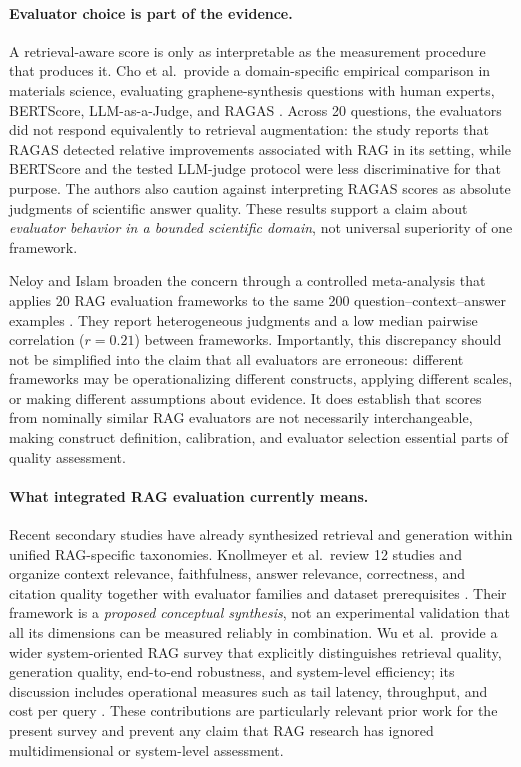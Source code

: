 \paragraph{Evaluator choice is part of the evidence.}
A retrieval-aware score is only as interpretable as the measurement procedure that produces it. Cho et al.\ provide a domain-specific empirical comparison in materials science, evaluating graphene-synthesis questions with human experts, BERTScore, LLM-as-a-Judge, and RAGAS \cite{cho2026graphene}. Across 20 questions, the evaluators did not respond equivalently to retrieval augmentation: the study reports that RAGAS detected relative improvements associated with RAG in its setting, while BERTScore and the tested LLM-judge protocol were less discriminative for that purpose. The authors also caution against interpreting RAGAS scores as absolute judgments of scientific answer quality. These results support a claim about \emph{evaluator behavior in a bounded scientific domain}, not universal superiority of one framework.

Neloy and Islam broaden the concern through a controlled meta-analysis that applies 20 RAG evaluation frameworks to the same 200 question--context--answer examples \cite{neloy2026metarag}. They report heterogeneous judgments and a low median pairwise correlation ($r=0.21$) between frameworks. Importantly, this discrepancy should not be simplified into the claim that all evaluators are erroneous: different frameworks may be operationalizing different constructs, applying different scales, or making different assumptions about evidence. It does establish that scores from nominally similar RAG evaluators are not necessarily interchangeable, making construct definition, calibration, and evaluator selection essential parts of quality assessment.

\paragraph{What integrated RAG evaluation currently means.}
Recent secondary studies have already synthesized retrieval and generation within unified RAG-specific taxonomies. Knollmeyer et al.\ review 12 studies and organize context relevance, faithfulness, answer relevance, correctness, and citation quality together with evaluator families and dataset prerequisites \cite{knollmeyer2026rag}. Their framework is a \emph{proposed conceptual synthesis}, not an experimental validation that all its dimensions can be measured reliably in combination. Wu et al.\ provide a wider system-oriented RAG survey that explicitly distinguishes retrieval quality, generation quality, end-to-end robustness, and system-level efficiency; its discussion includes operational measures such as tail latency, throughput, and cost per query \cite{wu2026ragsurvey}. These contributions are particularly relevant prior work for the present survey and prevent any claim that RAG research has ignored multidimensional or system-level assessment.

